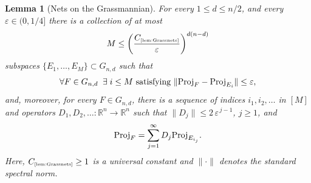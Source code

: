 \documentclass[11pt]{amsart}
\newtheorem{lemma}[theorem]{Lemma}
\theoremstyle{definition}
\theoremstyle{plain}
\newcommand{\R}{\mathbb{R}}
\def\R{{\mathbb R}}
\def\Proj{{\rm Proj}}
\begin{document}
\begin{lemma}[Nets on the Grassmannian]\label{lem:Grassnets}
For every $1\leq d\leq n/2$, and every
$\varepsilon\in(0,1/4]$
there is a collection of at most 
$$
M\leq \left( \frac{C_{\text{\tiny\ref{lem:Grassnets}}}}{\varepsilon} \right)^{d(n - d)}
$$
subspaces $\{E_1, \dots, E_M\}\subset G_{n,d}$
such that
\[
\forall F \in G_{n,d} \;\; \exists\; i \le M \text{ satisfying } \|\Proj_F - \Proj_{E_i}\| \le \varepsilon,
\]
and, moreover,
for every $F \in G_{n,d}$, there is a sequence of indices
$i_1,i_2,\dots$ in $[M]$ and operators $D_1,D_2,\dots:\R^n\to\R^n$
such that $\|D_j\| \le 2\, \varepsilon^{\,j-1}$, $j\geq 1$, and
\begin{equation}\label{eq: grass 209548y3}
\Proj_{F}= \sum_{j=1}^\infty D_j \Proj_{E_{i_j}}.
\end{equation}
Here, $C_{\text{\tiny\ref{lem:Grassnets}}}\geq 1$ is a universal constant
and $\|\cdot\|$ denotes the standard spectral norm.
\end{lemma}
\end{document}
